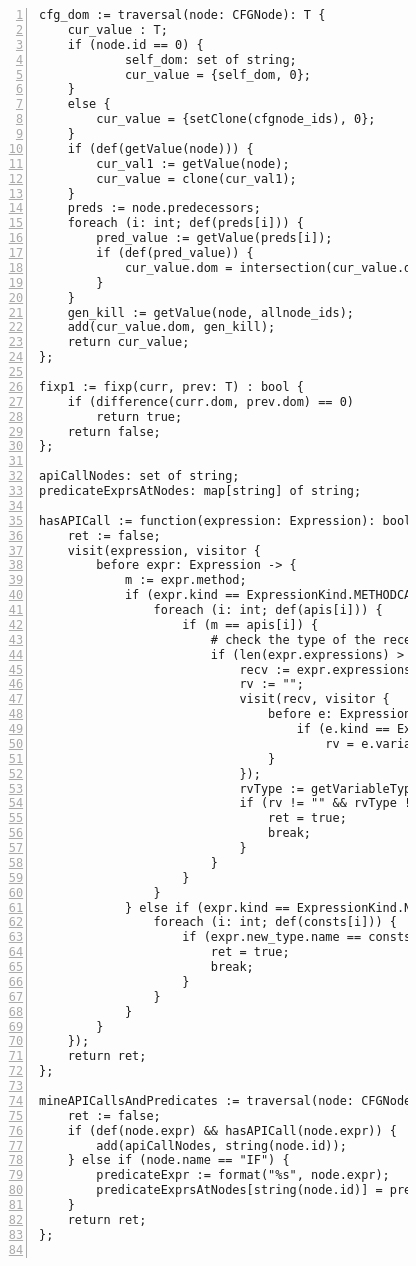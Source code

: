 \begin{figure}[ht!]
\begin{lstlisting}[numbers=left, tabsize=4, escapechar=@, caption={API Precondition Mining Analysis},label={lst:apm-code}, lastline = 10]
cfg_dom := traversal(node: CFGNode): T {
	cur_value : T;
	if (node.id == 0) {
			self_dom: set of string;
			cur_value = {self_dom, 0};
	}
	else {
		cur_value = {setClone(cfgnode_ids), 0};
	}
	if (def(getValue(node))) {
		cur_val1 := getValue(node);
		cur_value = clone(cur_val1);
	}
	preds := node.predecessors;
	foreach (i: int; def(preds[i])) {
		pred_value := getValue(preds[i]);
		if (def(pred_value)) {
			cur_value.dom = intersection(cur_value.dom,pred_value.dom);
		}
	}	
	gen_kill := getValue(node, allnode_ids);
	add(cur_value.dom, gen_kill);
	return cur_value;
};

fixp1 := fixp(curr, prev: T) : bool {
 	if (difference(curr.dom, prev.dom) == 0)
 		return true;	
 	return false;
};

apiCallNodes: set of string;
predicateExprsAtNodes: map[string] of string;

hasAPICall := function(expression: Expression): bool {
    ret := false;
    visit(expression, visitor {
		before expr: Expression -> {
		    m := expr.method;
		    if (expr.kind == ExpressionKind.METHODCALL) {
		        foreach (i: int; def(apis[i])) {
                    if (m == apis[i]) {
                        # check the type of the receiver
                        if (len(expr.expressions) > 0) {
                            recv := expr.expressions[0];
                            rv := "";
                            visit(recv, visitor {
                                before e: Expression -> {
                                    if (e.kind == ExpressionKind.VARACCESS) 
                                        rv = e.variable;
                                }
                            });
                            rvType := getVariableType(rv);
                            if (rv != "" && rvType != "") {
                                ret = true;
                                break;
                            }
                        }
                    }
                } 
		    } else if (expr.kind == ExpressionKind.NEW) {
                foreach (i: int; def(consts[i])) {
                    if (expr.new_type.name == consts[i]) {
                        ret = true;
                        break;
                    }
                }
            }
		}
    });
    return ret;
};

mineAPICallsAndPredicates := traversal(node: CFGNode): bool { 
    ret := false;
    if (def(node.expr) && hasAPICall(node.expr)) {
		add(apiCallNodes, string(node.id));
	} else if (node.name == "IF") {
		predicateExpr := format("%s", node.expr);
		predicateExprsAtNodes[string(node.id)] = predicateExpr;
	}
	return ret;
};


\end{lstlisting}
\end{figure}
